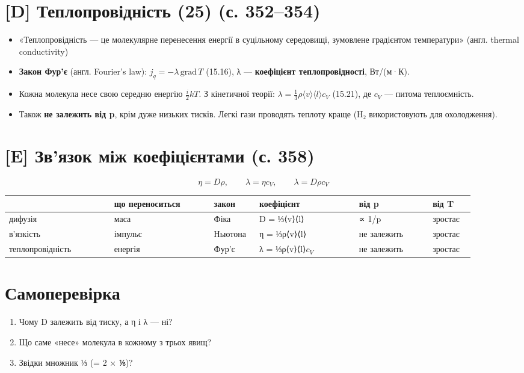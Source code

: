 \documentclass[11pt,a4paper,oneside]{book}
\begin{document}
\section*{[D] Теплопровідність (25) (с. 352–354)}
\begin{itemize}
\item «Теплопровідність — це молекулярне перенесення енергії в суцільному середовищі, зумовлене градієнтом температури» (англ. thermal conductivity)
\item \textbf{Закон Фур'є} (англ. Fourier's law): $j_q = -\lambda\,\text{grad}\,T$ (15.16), λ — \textbf{коефіцієнт теплопровідності}, Вт/(м·К).
\item Кожна молекула несе свою середню енергію $\tfrac i2kT$. З кінетичної теорії:
$\lambda = \tfrac13\rho\langle v\rangle\langle l\rangle c_V$ (15.21), де $c_{V}$ — питома теплоємність.
\item Також \textbf{не залежить від p}, крім дуже низьких тисків. Легкі гази проводять теплоту краще (H₂ використовують для охолодження).
\end{itemize}

\section*{[E] Зв'язок між коефіцієнтами (с. 358)}
\[\eta = D\rho,\qquad \lambda = \eta c_V,\qquad \lambda = D\rho c_V\]
{\footnotesize
\begin{longtable}{>{\raggedright\arraybackslash}p{0.204\linewidth}>{\raggedright\arraybackslash}p{0.191\linewidth}>{\raggedright\arraybackslash}p{0.089\linewidth}>{\raggedright\arraybackslash}p{0.191\linewidth}>{\raggedright\arraybackslash}p{0.140\linewidth}>{\raggedright\arraybackslash}p{0.089\linewidth}}
\toprule
\textbf{} & \textbf{що переноситься} & \textbf{закон} & \textbf{коефіцієнт} & \textbf{від p} & \textbf{від T} \\
\midrule
\endhead
дифузія & маса & Фіка & D = ⅓⟨v⟩⟨l⟩ & ∝ 1/p & зростає \\
в'язкість & імпульс & Ньютона & η = ⅓ρ⟨v⟩⟨l⟩ & не залежить & зростає \\
теплопровідність & енергія & Фур'є & λ = ⅓ρ⟨v⟩⟨l⟩$c_{V}$ & не залежить & зростає \\
\bottomrule
\end{longtable}
}

\section*{Самоперевірка}
\begin{enumerate}
\item Чому D залежить від тиску, а η і λ — ні?
\item Що саме «несе» молекула в кожному з трьох явищ?
\item Звідки множник ⅓ (= 2 × ⅙)?
\end{enumerate}
\end{document}
